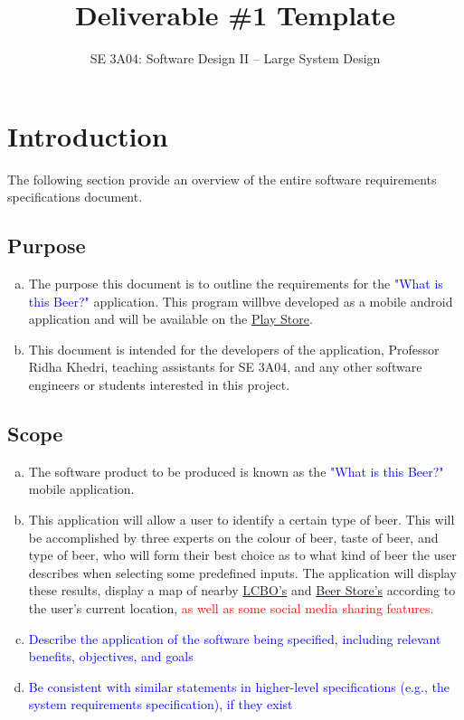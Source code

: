 \documentclass[]{article}
\title{Deliverable \#1 Template}
\author{SE 3A04: Software Design II -- Large System Design}
\date{}
\begin{document}
\maketitle	
\newpage
\tableofcontents
\listoftables
\newpage

\section{Introduction}
\label{sec:introduction}

The following section provide an overview of the entire software requirements specifications document.

\subsection{Purpose}
\label{sub:purpose}
\begin{enumerate}[a)]
	\item The purpose this document is to outline the requirements for the \textcolor{blue}{"What is this Beer?"} application. This program willbve developed as a mobile android application and will be available on the \underline{Play Store}.
	\item This document is intended for the developers of the application, Professor Ridha Khedri, teaching assistants for SE 3A04, and any other software engineers or students interested in this project.
\end{enumerate}

\subsection{Scope}
\label{sub:scope}
\begin{enumerate}[a)]
	\item The software product to be produced is known as the \textcolor{blue}{"What is this Beer?"} mobile application.
	\item This application will allow a user to identify a certain type of beer. This will be accomplished by three experts on the colour of beer, taste of beer, and type of beer, who will form their best choice as to what kind of beer the user describes when selecting some predefined inputs. The application will display these results, display a map of nearby \underline{LCBO's} and \underline{Beer Store's} according to the user's current location, \textcolor{red}{as well as some social media sharing features.}
	\item \textcolor{blue}{Describe the application of the software being specified, including relevant benefits, objectives, and goals}
	\item \textcolor{blue}{Be consistent with similar statements in higher-level specifications (e.g., the system requirements specification), if they exist}
\end{enumerate}
\end{document}
